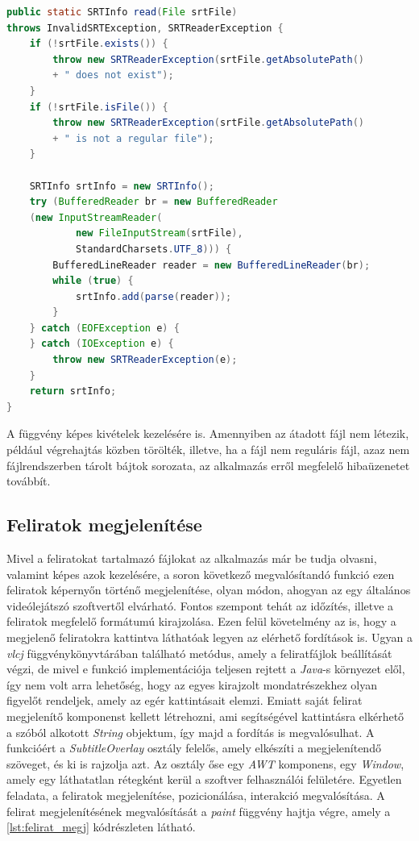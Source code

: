 \begin{spacing}{1.25}
\begin{lstlisting}[caption=Srt fájlok feldolgozása, label={lst:srt_feldolgozas}, language=java,  showstringspaces=false]
public static SRTInfo read(File srtFile) 
throws InvalidSRTException, SRTReaderException {
    if (!srtFile.exists()) {
        throw new SRTReaderException(srtFile.getAbsolutePath()
        + " does not exist");
    }
    if (!srtFile.isFile()) {
        throw new SRTReaderException(srtFile.getAbsolutePath()
        + " is not a regular file");
    }

    SRTInfo srtInfo = new SRTInfo();
    try (BufferedReader br = new BufferedReader
    (new InputStreamReader(
            new FileInputStream(srtFile),
            StandardCharsets.UTF_8))) {
        BufferedLineReader reader = new BufferedLineReader(br);
        while (true) {
            srtInfo.add(parse(reader));
        }
    } catch (EOFException e) {
    } catch (IOException e) {
        throw new SRTReaderException(e);
    }
    return srtInfo;
}
\end{lstlisting}
\end{spacing}

  A függvény képes kivételek kezelésére is. Amennyiben az átadott fájl nem létezik, például végrehajtás közben törölték, illetve, ha a fájl nem reguláris fájl, azaz nem fájlrendszerben tárolt bájtok sorozata, az alkalmazás erről megfelelő hibaüzenetet továbbít.
  
\subsection{Feliratok megjelenítése}
Mivel a feliratokat tartalmazó fájlokat az alkalmazás már be tudja olvasni, valamint képes azok kezelésére, a soron következő megvalósítandó funkció ezen feliratok képernyőn történő megjelenítése, olyan módon, ahogyan az egy általános videólejátszó szoftvertől elvárható. Fontos szempont tehát az időzítés, illetve a feliratok megfelelő formátumú kirajzolása. Ezen felül követelmény az is, hogy a megjelenő feliratokra kattintva láthatóak legyen az elérhető fordítások is. Ugyan a \textit{vlcj} függvénykönyvtárában található metódus, amely a feliratfájlok beállítását végzi, de mivel e funkció implementációja teljesen rejtett a \textit{Java}-s környezet elől, így nem volt arra lehetőség, hogy az egyes kirajzolt mondatrészekhez olyan figyelőt rendeljek, amely az egér kattintásait elemzi. Emiatt saját felirat megjelenítő komponenst kellett létrehozni, ami segítségével kattintásra elkérhető a szóból alkotott \textit{String} objektum, így majd a fordítás is megvalósulhat. A funkcióért a \textit{Subtitle\-Overlay} osztály felelős, amely elkészíti a megjelenítendő szöveget, és ki is rajzolja azt. Az osztály őse egy \textit{AWT} komponens, egy \textit{Window}, amely egy láthatatlan rétegként kerül a szoftver felhasználói felületére. Egyetlen feladata, a feliratok megjelenítése, pozicionálása, interakció megvalósítása. A felirat megjelenítésének megvalósítását a \textit{paint} függvény hajtja végre, amely a \ref{lst:felirat_megj} kódrészleten látható.

